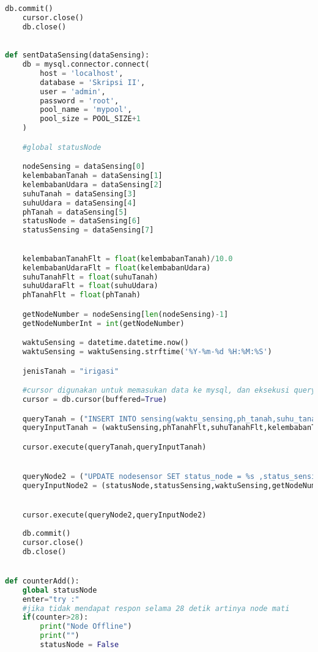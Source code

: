 \begin{lstlisting}[language=Python, caption=BaseStation.py]
    db.commit()
    cursor.close()
    db.close()
    

def sentDataSensing(dataSensing):
    db = mysql.connector.connect(
        host = 'localhost',
        database = 'Skripsi II',
        user = 'admin',
        password = 'root',
        pool_name = 'mypool',
        pool_size = POOL_SIZE+1
    )

    #global statusNode

    nodeSensing = dataSensing[0]
    kelembabanTanah = dataSensing[1]
    kelembabanUdara = dataSensing[2]
    suhuTanah = dataSensing[3]
    suhuUdara = dataSensing[4]
    phTanah = dataSensing[5]
    statusNode = dataSensing[6]
    statusSensing = dataSensing[7]
    

    kelembabanTanahFlt = float(kelembabanTanah)/10.0
    kelembabanUdaraFlt = float(kelembabanUdara)
    suhuTanahFlt = float(suhuTanah)
    suhuUdaraFlt = float(suhuUdara)
    phTanahFlt = float(phTanah)

    getNodeNumber = nodeSensing[len(nodeSensing)-1]
    getNodeNumberInt = int(getNodeNumber)

    waktuSensing = datetime.datetime.now() 
    waktuSensing = waktuSensing.strftime('%Y-%m-%d %H:%M:%S')

    jenisTanah = "irigasi"

    #cursor digunakan untuk memasukan data ke mysql, dan eksekusi query
    cursor = db.cursor(buffered=True)

    queryTanah = ("INSERT INTO sensing(waktu_sensing,ph_tanah,suhu_tanah,kelembaban_tanah,suhu_udara,kelembaban_udara,kode_petak,jenis_tanah) VALUES (%s,%s,%s,%s,%s,%s,%s,%s)")
    queryInputTanah = (waktuSensing,phTanahFlt,suhuTanahFlt,kelembabanTanahFlt,suhuUdaraFlt,kelembabanUdaraFlt,getNodeNumberInt,jenisTanah)

    cursor.execute(queryTanah,queryInputTanah)


    queryNode2 = ("UPDATE nodesensor SET status_node = %s ,status_sensing = %s, waktu_node = %s WHERE kode_node = %s")
    queryInputNode2 = (statusNode,statusSensing,waktuSensing,getNodeNumber)


    cursor.execute(queryNode2,queryInputNode2)
    
    db.commit()
    cursor.close()
    db.close()


def counterAdd():
    global statusNode
    enter="try :"
    #jika tidak mendapat respon selama 28 detik artinya node mati
    if(counter>28):
        print("Node Offline")
        print("")
        statusNode = False


\end{lstlisting}
